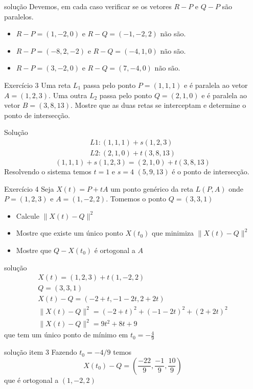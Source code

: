 \documentclass{beamer}
\begin{document}
\begin{frame}{solução}
  Devemos, em cada caso verificar se os vetores $R-P$ e $Q-P$ são paralelos.
  \begin{itemize}
    \item $R-P =(1,-2,0)$ e $R-Q=(-1,-2,2)$ não são.
    \item $R-P =(-8,2,-2)$ e $R-Q=(-4,1,0)$ não são.
    \item $R-P =(3,-2,0)$ e $R-Q=(7,-4,0)$ não são.
  \end{itemize}
\end{frame}

\begin{frame}{Exercício 3}
   Uma reta $L_1$ passa pelo ponto $P=(1,1,1)$ e é paralela ao vetor $A=(1,2,3).$ Uma outra $L_2$ passa pelo ponto $Q=(2,1,0)$ e é paralela ao vetor $B=(3,8,13).$  Mostre que as duas retas se interceptam e determine o ponto de intersecção.
\end{frame}

\begin{frame}{Solução}
  \begin{gather*}
    L1: (1,1,1) + s(1,2,3) \\
    L2: (2,1,0) + t(3,8,13)
  \end{gather*}
$$(1,1,1) + s(1,2,3)= (2,1,0) + t(3,8,13)$$
  Resolvendo o sistema temos 
  $t=1$ e $s=4$
  $(5,9,13)$ é o ponto de intersecção.

\end{frame}

\begin{frame}{Exercício 4}
Seja $X(t) = P + tA$ um ponto genérico da reta $L(P,A)$ onde $P=(1,2,3)$ e $A=(1,-2,2).$ Tomemos o ponto $Q=(3,3,1)$
\begin{itemize}
    \item Calcule $\| X(t) - Q \|^2$
    \item Mostre que existe um único ponto $X(t_0)$ que minimiza $\| X(t) - Q \|^2$
    \item Mostre que $Q-X(t_0)$ é ortogonal a $A$
\end{itemize}
    \end{frame}

    \begin{frame}{solução}
     \begin{gather*}
       X(t) = (1,2,3)+t(1,-2,2) \\
       Q=(3,3,1)\\
       X(t)-Q =(-2+t,-1-2t,2+2t)\\
       \|X(t)-Q\|^2 = (-2+t)^2 + (-1-2t)^2+(2+2t)^2\\
       \|X(t)-Q\|^2 = 9t^2 + 8t +9
     \end{gather*} 
     que tem um único ponto de mínimo em $t_0=-\frac{4}{9}$
    \end{frame}
    \begin{frame}{solução item 3}
      Fazendo $t_0=-4/9$ temos
      $$X(t_0)-Q = (\frac{-22}{9}, \frac{-1}{9},\frac{10}{9})$$
      que é ortogonal a $(1,-2,2)$
    \end{frame}
   
\end{document}
